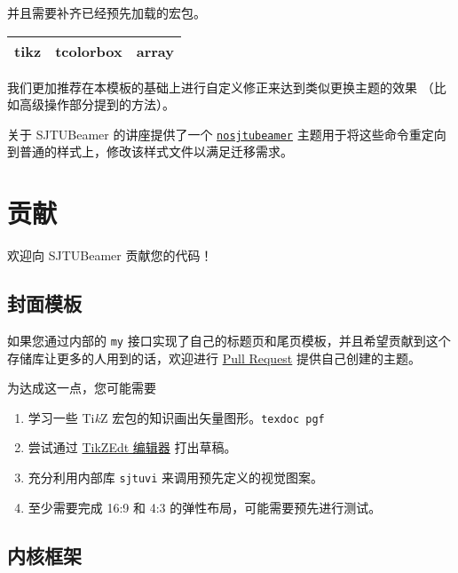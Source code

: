 \documentclass[
    UTF8,
    heading=true,
    12pt,
    a4paper
]{ctexrep}
\newcommand{\cls}[1]{\texttt{#1}}
\newcommand{\opt}[1]{\texttt{#1}}
\def\themename{\textsf{SJTUBeamer}}
\begin{document}
并且需要补齐已经预先加载的宏包。

\begin{table}[h]
  \centering

  \begin{tabular}
    {>{\sffamily}c>{\sffamily}c>{\sffamily}c}
    \hline
    tikz & tcolorbox & array \\
    \hline
  \end{tabular}
\end{table}

我们更加推荐在本模板的基础上进行自定义修正来达到类似更换主题的效果
（比如高级操作部分提到的方法）。

关于 \themename{} 的讲座提供了一个
\href{https://github.com/sjtug/
  sjtulib-latex-talk/blob/logcreative-2022/
  beamerthemenosjtubeamer.sty}
{\cls{nosjtubeamer}}
主题用于将这些命令重定向到普通的样式上，修改该样式文件以满足迁移需求。

\chapter{贡献}

欢迎向 \themename{} 贡献您的代码！

\section{封面模板}

如果您通过内部的 \opt{my}
接口实现了自己的标题页和尾页模板，并且希望贡献到这个存储库让更多的人用到的话，欢迎进行
\href{https://github.com/sjtug/SJTUBeamer/pulls}{
  Pull Request}
提供自己创建的主题。

为达成这一点，您可能需要
\begin{enumerate}
  \item 学习一些 Ti\textit{k}Z
        宏包的知识画出矢量图形。\texttt{texdoc pgf}
  \item 尝试通过
        \href{https://code.google.com/archive/p/
          tikzedt/downloads}{TikZEdt 编辑器} 打出草稿。
  \item 充分利用内部库 \texttt{sjtuvi} 来调用预先定义的视觉图案。
  \item 至少需要完成 16:9 和 4:3 的弹性布局，可能需要预先进行测试。
\end{enumerate}

\section{内核框架}
\end{document}
